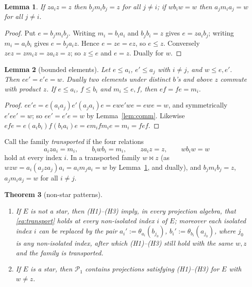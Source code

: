 \documentclass[11pt]{amsart}
\newtheorem{theorem}{Theorem}[section]
\newtheorem{lemma}[theorem]{Lemma}
\theoremstyle{definition}
\renewcommand{\P}{\mathcal{P}}      %
\newcommand{\mt}{\bowtie}      %
\begin{document}
\begin{lemma}\label{lem:rev}
If $za_iz=z$ then $b_jm_ib_j=z$ for all $j\ne i$; if $wb_iw=w$ then $a_jm_ia_j=w$ for all $j\ne i$.
\end{lemma}

\begin{proof}
Put $e=b_jm_ib_j$. Writing $m_i=b_ia_i$ and $b_jb_i=z$ gives $e=za_ib_j$; writing $m_i=a_ib_i$ gives $e=b_ja_iz$. Hence $e=ze=ez$, so $e\le z$. Conversely $zez=zm_iz=za_iz=z$; so $z\le e$ and $e=z$. Dually for $w$.
\end{proof}

\begin{lemma}[bounded elements]\label{lem:bounded}
Let $e\le a_i$, $e'\le a_j$ with $i\ne j$, and $w\le e,e'$. Then $ee'=e'e=w$. Dually two elements under distinct $b$'s and above $z$ commute with product $z$. If $e\le a_i$, $f\le b_i$ and $m_i\le e,f$, then $ef=fe=m_i$.
\end{lemma}

\begin{proof}
$ee'e=e(a_ia_j)e'(a_ja_i)e=ewe'we=ewe=w$, and symmetrically $e'ee'=w$; so $ee'=e'e=w$ by Lemma~\ref{lem:comm}. Likewise $efe=e(a_ib_i)f(b_ia_i)e=em_ifm_ie=m_i=fef$.
\end{proof}

Call the family \emph{transported} if the four relations
\begin{equation}\label{eq:transport}
a_iza_i=m_i,\qquad b_iwb_i=m_i,\qquad za_iz=z,\qquad wb_iw=w
\end{equation}
hold at every index $i$. In a transported family $w\mt z$ (as $wzw=a_i(a_jza_j)a_i=a_im_ja_i=w$ by Lemma~\ref{lem:rev}, and dually), and $b_jm_ib_j=z$, $a_jm_ia_j=w$ for all $i\ne j$.

\begin{theorem}[non-star patterns]\label{thm:nonstar}
\begin{enumerate}[label=\textup{(\alph*)}]
\item If $E$ is not a star, then \textup{(H1)}--\textup{(H3)} imply, in every projection algebra, that \eqref{eq:transport} holds at every non-isolated index $i$ of $E$; moreover each isolated index $i$ can be replaced by the pair $a_i':=\theta_{a_i}(b_{j_0})$, $b_i':=\theta_{b_i}(a_{j_0})$, where $j_0$ is any non-isolated index, after which \textup{(H1)}--\textup{(H3)} still hold with the same $w,z$ and the family is transported.
\item If $E$ is a star, then $\P_1$ contains projections satisfying \textup{(H1)}--\textup{(H3)} for $E$ with $w\ne z$.
\end{enumerate}
\end{theorem}
\end{document}
